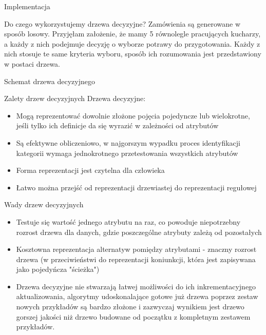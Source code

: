 \documentclass[a4paper,10pt]{beamer}
\begin{document}
		\begin{frame}{Implementacja}
			
		\end{frame}
		
		

		\begin{frame}{Do czego wykorzystujemy drzewa decyzyjne?}
			Zamówienia są generowane w sposób losowy. Przyjęłam założenie, że mamy 5 równolegle pracujących kucharzy, a każdy z nich podejmuje decyzję o wyborze potrawy do przygotowania. Każdy z nich stosuje te same kryteria wyboru, sposób ich rozumowania jest przedstawiony w postaci drzewa. 
		\end{frame}
		
		\begin{frame}{Schemat drzewa decyzyjnego}
		\end{frame}

		\begin{frame}{Zalety drzew decyzyjnych}
			Drzewa decyzyjne: 
				\begin{itemize}
						\item{Mogą reprezentować dowolnie złożone pojęcia pojedyncze lub wielokrotne, jeśli tylko ich definicje  da się wyrazić w zależności od atrybutów}
						\item{Są efektywne obliczeniowo, w najgorszym wypadku proces identyfikacji kategorii wymaga jednokrotnego przetestowania wszystkich atrybutów}
						\item {Forma reprezentacji jest czytelna dla człowieka}
						\item {Łatwo można przejść od reprezentacji drzewiastej do reprezentacji regułowej}
						\end{itemize}
		\end{frame}

		\begin{frame}{Wady drzew decyzyjnych}
			\begin{itemize}
				\item{Testuje się wartość jednego atrybutu na raz, co powoduje niepotrzebny rozrost drzewa dla danych, gdzie poszczególne atrybuty zależą od pozostałych}
				\item{Kosztowna reprezentacja alternatyw pomiędzy atrybutami - znaczny rozrost drzewa (w przeciwieństwi do reprezentacji koniunkcji, która jest zapisywana jako pojedyńcza "ścieżka")}
				\item{Drzewa decyzyjne nie stwarzają łatwej możliwości do ich inkrementacyjnego aktualizowania, algorytmy udoskonalające gotowe już drzewa poprzez zestaw nowych przykładów są bardzo złożone i zazwyczaj wynikiem jest drzewo gorszej jakości niż drzewo budowane od początku z kompletnym zestawem przykładów.}
			\end{itemize}
		\end{frame}
		
\end{document}
